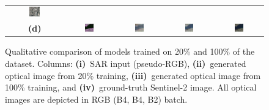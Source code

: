 \begin{figure}[!htbp]
\begin{tabular}{c *{4}{c}}
        \includegraphics[width=0.2\textwidth, height=0.2\textheight, keepaspectratio]{img/qualitative-20-full/sample_3/gt.png} \\
        \textbf{(d)} &
        \includegraphics[width=0.2\textwidth, height=0.2\textheight, keepaspectratio]{img/qualitative-20-full/sample_4/sar.png} &
        \includegraphics[width=0.2\textwidth, height=0.2\textheight, keepaspectratio]{img/qualitative-20-full/sample_4/gen_0.2.png} &
        \includegraphics[width=0.2\textwidth, height=0.2\textheight, keepaspectratio]{img/qualitative-20-full/sample_4/gen_full.png} &
        \includegraphics[width=0.2\textwidth, height=0.2\textheight, keepaspectratio]{img/qualitative-20-full/sample_4/gt.png} \\
    \end{tabular}

    \caption[Qualitative results for different training data scales: 20\% \& 100\%]{%
    Qualitative comparison of models trained on 20\% and 100\% of the dataset. 
    Columns: \textbf{(i)}~SAR input (pseudo-RGB), 
    \textbf{(ii)}~generated optical image from 20\% training, 
    \textbf{(iii)}~generated optical image from 100\% training, and 
    \textbf{(iv)}~ground-truth Sentinel-2 image. All optical images are depicted in RGB (B4, B4, B2) batch.}
    \label{fig:qualitative_results_100_20}
\end{figure}

